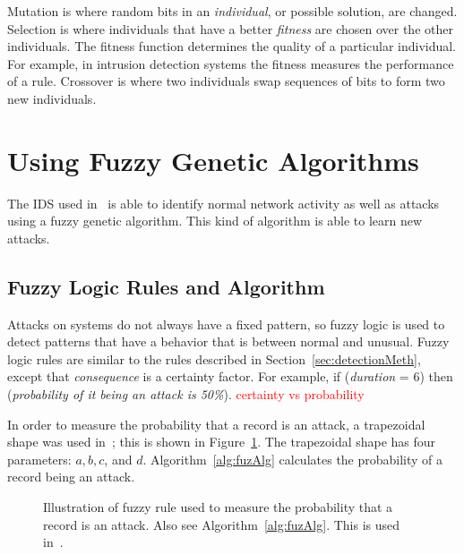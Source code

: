 \documentclass{sig-alternate}
\newcommand{\mycomment}[1]{\textcolor{red}{#1}}
\begin{document}
Mutation is where random bits in an \emph{individual}, or possible solution, are changed. Selection is where individuals that have a better \emph{fitness} are chosen over the other individuals. The fitness function determines the quality of a particular individual. For example, in intrusion detection systems the fitness measures the performance of a rule. Crossover is where two individuals swap sequences of bits to form two new individuals.~\cite{DBLP:journals/corr/abs-1204-6416}











\section{Using Fuzzy Genetic Algorithms}
\label{sec:fuzGenAlgImp}
The IDS used in~\cite{6496342, 6559603} is able to identify normal network activity as well as attacks using a fuzzy genetic algorithm. This kind of algorithm is able to learn new attacks.




\subsection{Fuzzy Logic Rules and Algorithm}
Attacks on systems do not always have a fixed pattern, so fuzzy logic is used to detect patterns that have a behavior that is between normal and unusual. Fuzzy logic rules are similar to the rules described in Section~\ref{sec:detectionMeth}, except that \emph{consequence} is a certainty factor. For example, if (\emph{duration} = 6) then (\emph{probability of it being an attack is 50\%}). \mycomment{certainty vs probability}

In order to measure the probability that a record is an attack, a trapezoidal shape was used in~\cite{6496342, 6559603}; this is shown in Figure~\ref{fig:trapFigure}. The trapezoidal shape has four parameters: $a, b, c$, and $d$. Algorithm~\ref{alg:fuzAlg} calculates the probability of a record being an attack.


\begin{figure}
\centering
{}
\caption{Illustration of fuzzy rule used to measure the probability that a record is an attack. Also see Algorithm~\ref{alg:fuzAlg}. This is used in~\cite{6496342, 6559603}.}
\label{fig:trapFigure}
\end{figure}
\end{document}
